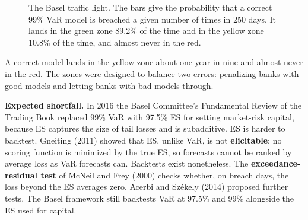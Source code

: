 \begin{figure}[htbp]
\centering
{}
\caption{The Basel traffic light. The bars give the probability that a correct 99\% VaR model is breached a given number of times in 250 days. It lands in the green zone 89.2\% of the time and in the yellow zone 10.8\% of the time, and almost never in the red.}
\label{fig:15-traffic}
\end{figure}

A correct model lands in the yellow zone about one year in nine and almost never in the red. The zones were designed to balance two errors: penalizing banks with good models and letting banks with bad models through.

\textbf{Expected shortfall.} In 2016 the Basel Committee's Fundamental Review of the Trading Book replaced 99\% VaR with 97.5\% ES for setting market-risk capital, because ES captures the size of tail losses and is subadditive. ES is harder to backtest. Gneiting (2011) showed that ES, unlike VaR, is not \textbf{elicitable}: no scoring function is minimized by the true ES, so forecasts cannot be ranked by average loss as VaR forecasts can. Backtests exist nonetheless. The \textbf{exceedance-residual test} of McNeil and Frey (2000) checks whether, on breach days, the loss beyond the ES averages zero. Acerbi and Sz\'ekely (2014) proposed further tests. The Basel framework still backtests VaR at 97.5\% and 99\% alongside the ES used for capital.

